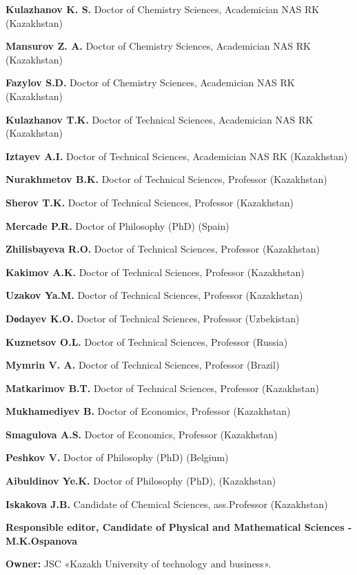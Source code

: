 \textbf{Kulazhanov K. S.} Doctor of Chemistry Sciences, Academician NAS
RK (Kazakhstan)

\textbf{Mansurov Z. A.} Doctor of Chemistry Sciences, Academician NAS RK
(Kazakhstan)

\textbf{Fazylov S.D.} Doctor of Chemistry Sciences, Academician NAS RK
(Kazakhstan)

\textbf{Kulazhanov T.K.} Doctor of Technical Sciences, Academician NAS
RK (Kazakhstan)

\textbf{Iztayev A.I.} Doctor of Technical Sciences, Academician NAS RK
(Kazakhstan)

\textbf{Nurakhmetov B.K.} Doctor of Technical Sciences, Professor
(Kazakhstan)

\textbf{Sherov T.K.} Doctor of Technical Sciences, Professor
(Kazakhstan)

\textbf{Mercade P.R.} Doctor of Philosophy (PhD) (Spain)

\textbf{Zhilisbayeva R.O.} Doctor of Technical Sciences, Professor
(Kazakhstan)

\textbf{Kakimov A.K.} Doctor of Technical Sciences, Professor
(Kazakhstan)

\textbf{Uzakov Ya.M.} Doctor of Technical Sciences, Professor
(Kazakhstan)

\textbf{Dоdayev K.O.} Doctor of Technical Sciences, Professor
(Uzbekistan)

\textbf{Kuznetsov O.L.} Doctor of Technical Sciences, Professor (Russia)

\textbf{Mymrin V. A.} Doctor of Technical Sciences, Professor (Brazil)

\textbf{Matkarimov B.T.} Doctor of Technical Sciences, Professor
(Kazakhstan)

\textbf{Mukhamediyev B.} Doctor of Economics, Professor (Kazakhstan)

\textbf{Smagulova A.S.} Doctor of Economics, Professor (Kazakhstan)

\textbf{Peshkov V.} Doctor of Philosophy (PhD) (Belgium)

\textbf{Aibuldinov Ye.K.} Doctor of Philosophy (PhD), (Kazakhstan)

\textbf{Iskakova J.B.} Candidate of Chemical Sciences, ass.Professor
(Kazakhstan)

\begin{center}
\textbf{Responsible editor, Candidate of Physical and Mathematical
Sciences -M.K.Ospanova}
\end{center}

\textbf{Owner:} JSC «Kazakh University of technology and business».

